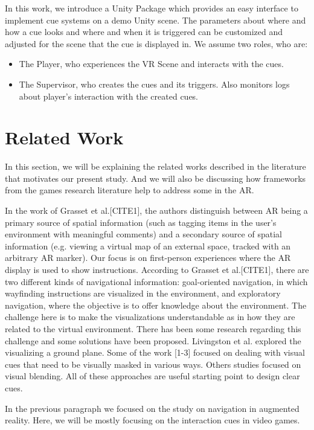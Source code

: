 \documentclass[conference]{IEEEtran}
\begin{document}
In this work, we introduce a Unity Package which provides an easy interface to implement cue systems on a demo Unity scene. The parameters about where and how a cue looks and where and when it is triggered can be customized and adjusted for the scene that the cue is displayed in. We assume two roles, who are:
\begin{itemize}
    \item The Player, who experiences the VR Scene and interacts with the cues.
    \item The Supervisor, who creates the cues and its triggers. Also monitors logs about player's interaction with the created cues.
\end{itemize}





\section{Related Work}

In this section, we will be explaining the related works described in the literature that motivates our present study. And we will also be discussing how frameworks from the games research literature help to address some in the AR. 

In the work of Grasset et al.[CITE1],  the authors distinguish between AR being a primary source of spatial information (such as tagging items in the user's environment with meaningful comments) and a secondary source of spatial information (e.g. viewing a virtual map of an external space, tracked with an arbitrary AR marker). Our focus is on first-person experiences where the AR display is used to show instructions. According to Grasset et al.[CITE1], there are two different kinds of navigational information: goal-oriented navigation, in which wayfinding instructions are visualized in the environment, and exploratory navigation, where the objective is to offer knowledge about the environment. The challenge here is to make the visualizations understandable as in how they are related to the virtual environment. There has been some research regarding this challenge and some solutions have been proposed. Livingston et al. explored the visualizing a ground plane. Some of the work [1-3] focused on dealing with visual cues that need to be visually masked in various ways. Others studies focused on visual blending. All of these approaches are useful starting point to design clear cues. 

In the previous paragraph we focused on the study on navigation in augmented reality. Here, we will be mostly focusing on the interaction cues in video games. 
\end{document}

